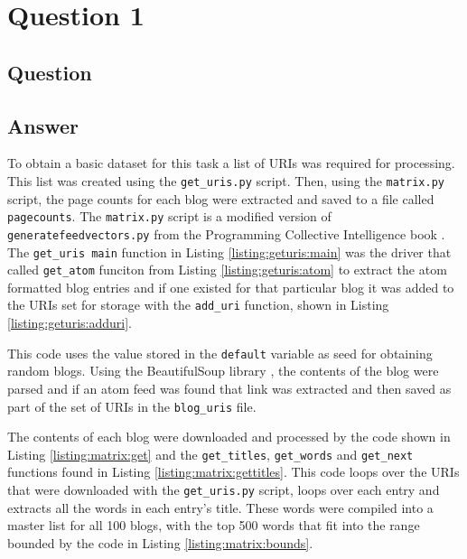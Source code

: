 \section{Question 1}

\subsection{Question}


\subsection{Answer}
To obtain a basic dataset for this task a list of URIs was required for processing. This list was created using the {\tt get\_uris.py} script. Then, using the {\tt matrix.py} script, the page counts for each blog were extracted and saved to a file called {\tt pagecounts}. The {\tt matrix.py} script is a modified version of {\tt generatefeedvectors.py} from the Programming Collective Intelligence book \cite{pci}. The {\tt get\_uris main} function in Listing \ref{listing:geturis:main} was the driver that called {\tt get\_atom} funciton from Listing \ref{listing:geturis:atom} to extract the atom \cite{atom} formatted blog entries and if one existed for that particular blog it was added to the URIs set for storage with the {\tt add\_uri} function, shown in Listing \ref{listing:geturis:adduri}.








This code uses the value stored in the {\tt default} variable as seed for obtaining random blogs. Using the BeautifulSoup library \cite{py:soup}, the contents of the blog were parsed and if an atom feed was found that link was extracted and then saved as part of the set of URIs in the {\tt blog\_uris} file.

The contents of each blog were downloaded and processed by the code shown in Listing \ref{listing:matrix:get} and the {\tt get\_titles}, {\tt get\_words} and {\tt get\_next} functions found in Listing \ref{listing:matrix:gettitles}. This code loops over the URIs that were downloaded with the {\tt get\_uris.py} script, loops over each entry and extracts all the words in each entry's title. These words were compiled into a master list for all 100 blogs, with the top 500 words that fit into the range bounded by the code in Listing \ref{listing:matrix:bounds}. 

